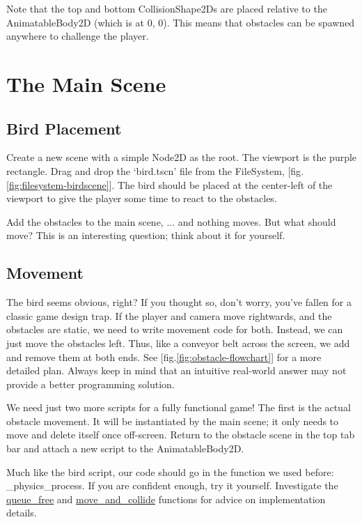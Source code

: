 \documentclass[14pt]{extarticle}
\newcommand{\prettyref}[2]{[{#1}.\ref{#2}]}
\begin{document}
Note that the top and bottom CollisionShape2Ds are placed relative to the AnimatableBody2D (which is at 0, 0). This means that obstacles can be spawned anywhere to challenge the player.

\clearpage
\section{The Main Scene}
\subsection*{Bird Placement}
Create a new scene with a simple Node2D as the root. The viewport is the purple rectangle. Drag and drop the `bird.tscn' file from the FileSystem, \prettyref{fig}{fig:filesystem-birdscene}. The bird should be placed at the center-left of the viewport to give the player some time to react to the obstacles.


Add the obstacles to the main scene, ... and nothing moves. But what should move? This is an interesting question; think about it for yourself.

\clearpage
\subsection*{Movement}
The bird seems obvious, right? If you thought so, don't worry, you've fallen for a classic game design trap. If the player and camera move rightwards, and the obstacles are static, we need to write movement code for both. Instead, we can just move the obstacles left. Thus, like a conveyor belt across the screen, we add and remove them at both ends. See \prettyref{fig}{fig:obstacle-flowchart} for a more detailed plan. Always keep in mind that an intuitive real-world answer may not provide a better programming solution.


We need just two more scripts for a fully functional game! The first is the actual obstacle movement. It will be instantiated by the main scene; it only needs to move and delete itself once off-screen. Return to the obstacle scene in the top tab bar and attach a new script to the AnimatableBody2D.

Much like the bird script, our code should go in the function we used before: \_physics\_process. If you are confident enough, try it yourself. Investigate the \href{https://docs.godotengine.org/en/stable/classes/class_node.html#class-node-method-queue-free}{queue\_free} and \href{https://docs.godotengine.org/en/stable/tutorials/physics/physics_introduction.html#move-and-collide}{move\_and\_collide} functions for advice on implementation details.
\end{document}
